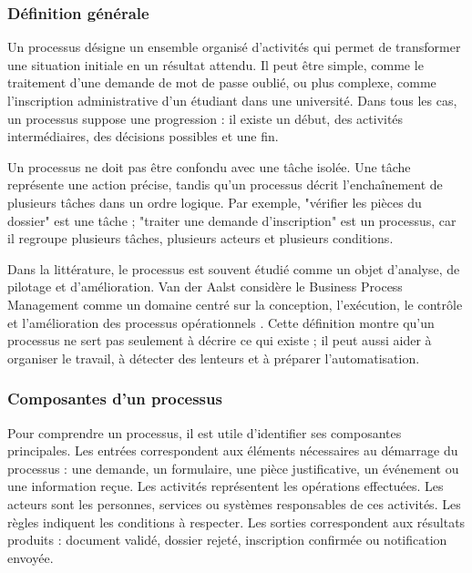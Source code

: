 \subsubsection{Définition générale}

Un processus désigne un ensemble organisé d'activités qui permet de transformer une situation initiale en un résultat attendu. Il peut être simple, comme le traitement d'une demande de mot de passe oublié, ou plus complexe, comme l'inscription administrative d'un étudiant dans une université. Dans tous les cas, un processus suppose une progression : il existe un début, des activités intermédiaires, des décisions possibles et une fin.

Un processus ne doit pas être confondu avec une tâche isolée. Une tâche représente une action précise, tandis qu'un processus décrit l'enchaînement de plusieurs tâches dans un ordre logique. Par exemple, "vérifier les pièces du dossier" est une tâche ; "traiter une demande d'inscription" est un processus, car il regroupe plusieurs tâches, plusieurs acteurs et plusieurs conditions.

Dans la littérature, le processus est souvent étudié comme un objet d'analyse, de pilotage et d'amélioration. Van der Aalst considère le Business Process Management comme un domaine centré sur la conception, l'exécution, le contrôle et l'amélioration des processus opérationnels \cite{aalst2013}. Cette définition montre qu'un processus ne sert pas seulement à décrire ce qui existe ; il peut aussi aider à organiser le travail, à détecter des lenteurs et à préparer l'automatisation.

\subsubsection{Composantes d'un processus}

Pour comprendre un processus, il est utile d'identifier ses composantes principales. Les entrées correspondent aux éléments nécessaires au démarrage du processus : une demande, un formulaire, une pièce justificative, un événement ou une information reçue. Les activités représentent les opérations effectuées. Les acteurs sont les personnes, services ou systèmes responsables de ces activités. Les règles indiquent les conditions à respecter. Les sorties correspondent aux résultats produits : document validé, dossier rejeté, inscription confirmée ou notification envoyée.

